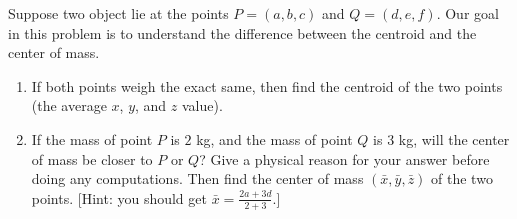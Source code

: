 \begin{problem}%
 Suppose two object lie at the points $P=(a,b,c)$ and $Q=(d,e,f)$.
 Our goal in this problem is to understand the difference between the centroid and the center of mass.
\begin{enumerate}
 \item If both points weigh the exact same, then find the centroid of the two points (the average $x$, $y$, and $z$ value).
 \item If the mass of point $P$ is $2$ kg, and the mass of point $Q$ is 3 kg, will the center of mass be closer to $P$ or $Q$? Give a physical reason for your answer before doing any computations.  Then find the center of mass $(\bar x, \bar y, \bar z)$ of the two points. [Hint: you should get $\bar x= \frac{2a+3d}{2+3}$.] 
\end{enumerate}
\end{problem}


